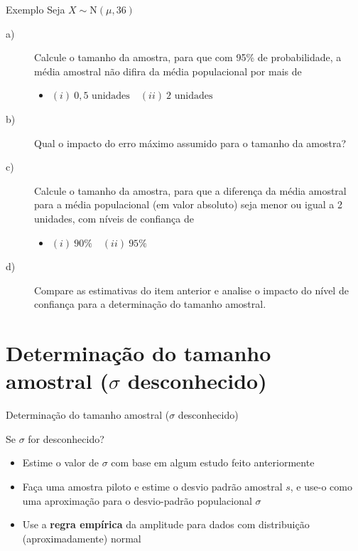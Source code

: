 \documentclass[14pt,aspectratio=1610]{beamer}
\begin{document}
	\begin{frame}{}
		\begin{block}{Exemplo}
			\justifying
			Seja $X \sim \text{N}(\mu,36)$
			\begin{description}
				\item[a)~]Calcule o tamanho da amostra, para que com 95\% de probabilidade, a média amostral não difira da média populacional por mais de 
				\begin{itemize}
					\item $(i)\ 0,5 \text{ unidades} \quad (ii)\ 2 \text{ unidades}$
				\end{itemize}
				\item[b)~]Qual o impacto do erro máximo assumido para o tamanho da amostra?
				\item[c)~]Calcule o tamanho da amostra, para que a diferença da média amostral para a média populacional (em valor absoluto) seja menor ou igual a 2 unidades, com níveis de confiança de
				\begin{itemize}
					\item $(i)\ 90\% \quad (ii)\ 95\%$
				\end{itemize}
				\item[d)~] Compare as estimativas do item anterior e analise o impacto do nível de confiança para a determinação do tamanho amostral.
			\end{description}
		\end{block}
	\end{frame}
	
	\section{Determinação do tamanho amostral ($\sigma$ desconhecido)}
	\begin{frame}{Determinação do tamanho amostral ($\sigma$ desconhecido)}
		\begin{block}{}
			\justifying
			Se $\sigma$ for desconhecido?
			\begin{itemize}
				\item Estime o valor de $\sigma$ com base em algum estudo feito anteriormente
				\item Faça uma amostra piloto e estime o desvio padrão amostral $s$, e use-o como uma aproximação para o desvio-padrão populacional $\sigma$
				\item Use a \textbf{regra empírica} da amplitude para dados com distribuição (aproximadamente) normal
			\end{itemize}
		\end{block}
	\end{frame}
	
\end{document}

